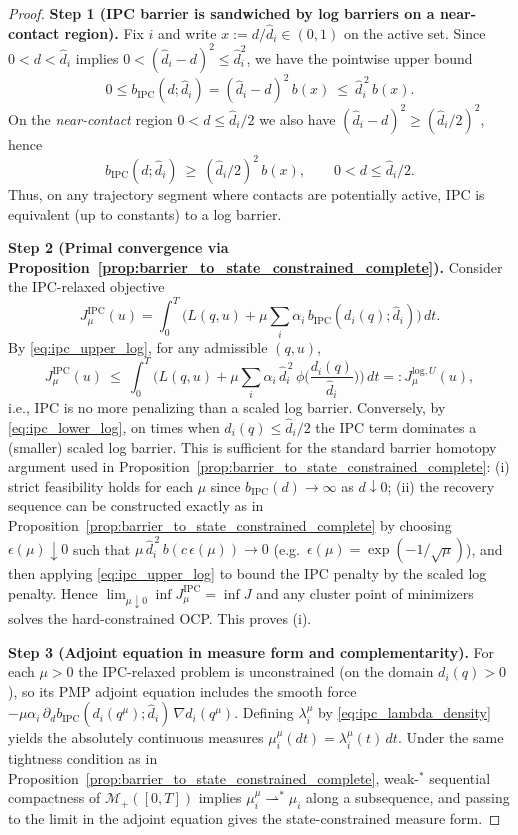 \begin{proof}
\textbf{Step 1 (IPC barrier is sandwiched by log barriers on a near-contact region).}
Fix $i$ and write $x:=d/\hat d_i\in(0,1)$ on the active set. Since $0<d<\hat d_i$ implies
$0<(\hat d_i-d)^2\le \hat d_i^2$, we have the pointwise upper bound
\begin{equation}
\label{eq:ipc_upper_log}
0\le b_{\mathrm{IPC}}(d;\hat d_i)=(\hat d_i-d)^2\,b(x)\ \le\ \hat d_i^{\,2}\,b(x).
\end{equation}
On the \emph{near-contact} region $0<d\le \hat d_i/2$ we also have $(\hat d_i-d)^2\ge (\hat d_i/2)^2$, hence
\begin{equation}
\label{eq:ipc_lower_log}
b_{\mathrm{IPC}}(d;\hat d_i)\ \ge\ (\hat d_i/2)^{2}\,b(x),
\qquad 0<d\le \hat d_i/2.
\end{equation}
Thus, on any trajectory segment where contacts are potentially active, IPC is equivalent (up to constants) to a log barrier.

\textbf{Step 2 (Primal convergence via Proposition~\ref{prop:barrier_to_state_constrained_complete}).}
Consider the IPC-relaxed objective
\[
J_\mu^{\mathrm{IPC}}(u)=\int_0^T\Big(L(q,u)+\mu\sum_i \alpha_i\,b_{\mathrm{IPC}}(d_i(q);\hat d_i)\Big)\,dt.
\]
By \cref{eq:ipc_upper_log}, for any admissible $(q,u)$,
\[
J_\mu^{\mathrm{IPC}}(u)\ \le\ \int_0^T\Big(L(q,u)+\mu\sum_i \alpha_i\,\hat d_i^{\,2}\,\phi\!\Big(\frac{d_i(q)}{\hat d_i}\Big)\Big)\,dt
=:J_\mu^{\mathrm{log},U}(u),
\]
i.e., IPC is no more penalizing than a scaled log barrier.
Conversely, by \cref{eq:ipc_lower_log}, on times when $d_i(q)\le \hat d_i/2$ the IPC term dominates a (smaller) scaled log barrier.
This is sufficient for the standard barrier homotopy argument used in Proposition~\ref{prop:barrier_to_state_constrained_complete}:
(i) strict feasibility holds for each $\mu$ since $b_{\mathrm{IPC}}(d)\to\infty$ as $d\downarrow 0$;
(ii) the recovery sequence can be constructed exactly as in Proposition~\ref{prop:barrier_to_state_constrained_complete} by choosing
$\epsilon(\mu)\downarrow 0$ such that $\mu\,\hat d_i^{\,2}\,b(c\,\epsilon(\mu))\to 0$ (e.g.\ $\epsilon(\mu)=\exp(-1/\sqrt{\mu})$),
and then applying \cref{eq:ipc_upper_log} to bound the IPC penalty by the scaled log penalty.
Hence $\lim_{\mu\downarrow 0}\inf J_\mu^{\mathrm{IPC}}=\inf J$ and any cluster point of minimizers solves the hard-constrained OCP.
This proves (i).

\textbf{Step 3 {(Adjoint equation in measure form and complementarity)}.}
For each $\mu>0$ the IPC-relaxed problem is unconstrained (on the domain $d_i(q)>0$), so its PMP adjoint equation includes the smooth force
$-\mu\alpha_i\,\partial_d b_{\mathrm{IPC}}(d_i(q^\mu);\hat d_i)\,\nabla d_i(q^\mu)$.
Defining $\lambda_i^\mu$ by \cref{eq:ipc_lambda_density} yields the absolutely continuous measures $\mu_i^\mu(dt)=\lambda_i^\mu(t)\,dt$.
Under the same tightness condition as in Proposition~\ref{prop:barrier_to_state_constrained_complete}, weak-$^\ast$ sequential compactness of
$\mathcal M_+([0,T])$ implies $\mu_i^\mu\rightharpoonup^\ast \mu_i$ along a subsequence, and passing to the limit in the adjoint equation gives
the state-constrained measure form.


\end{proof}
